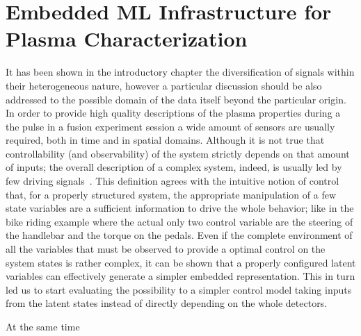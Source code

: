
\chapter{Embedded ML Infrastructure for Plasma Characterization}
\label{section:4_embedded_ML}

It has been shown in the introductory chapter the diversification of signals within their heterogeneous nature, however a particular discussion should be also addressed to the possible domain of the data itself beyond the particular origin.
In order to provide high quality descriptions of the plasma properties during a the pulse in a fusion experiment session a wide amount of sensors are usually required, both in time and in spatial domains.
Although it is not true that controllability (and observability) of the system strictly depends on that amount of inputs; the overall description of a complex system, indeed, is usually led by few driving signals~\cite{Liu2011}. 
This definition agrees with the intuitive notion of control that, for a properly structured system, the appropriate manipulation of a few state variables are a sufficient information to drive the whole behavior; like in the bike riding example where the actual only two control variable are the steering of the handlebar and the torque on the pedals. Even if the complete environment of all the variables that must be observed to provide a optimal control on the system states is rather complex, it can be shown that a properly configured latent variables can effectively generate a simpler embedded representation. This in turn led us to start evaluating the possibility to  a simpler control model taking inputs from the latent states instead of directly depending on the whole detectors.

At the same time 



